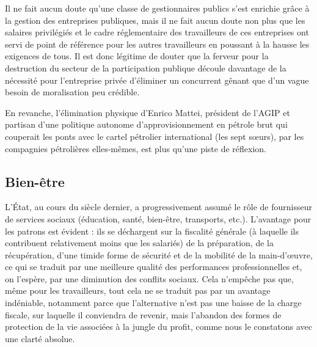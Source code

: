 Il ne fait aucun doute qu'une classe de gestionnaires publics s'est enrichie grâce à la gestion des entreprises publiques, mais il ne fait aucun doute non plus que les salaires privilégiés et le cadre réglementaire des travailleurs de ces entreprises ont servi de point de référence pour les autres travailleurs en poussant à la hausse les exigences de tous. Il est donc légitime de douter que la ferveur pour la destruction du secteur de la participation publique découle davantage de la nécessité pour l'entreprise privée d'éliminer un concurrent gênant que d'un vague besoin de moralisation peu crédible.

En revanche, l'élimination physique d'Enrico Mattei, président de l'AGIP et partisan d'une politique autonome d'approvisionnement en pétrole brut qui couperait les ponts avec le cartel pétrolier international (les sept sœurs), par les compagnies pétrolières elles-mêmes, est plus qu'une piste de réflexion.

\subsection{Bien-être}

L'État, au cours du siècle dernier, a progressivement assumé le rôle de fournisseur de services sociaux (éducation, santé, bien-être, transports, etc.). L'avantage pour les patrons est évident : ils se déchargent sur la fiscalité générale (à laquelle ils contribuent relativement moins que les salariés) de la préparation, de la récupération, d'une timide forme de sécurité et de la mobilité de la main-d'œuvre, ce qui se traduit par une meilleure qualité des performances professionnelles et, on l'espère, par une diminution des conflits sociaux. Cela n'empêche pas que, même pour les travailleurs, tout cela ne se traduit pas par un avantage indéniable, notamment parce que l'alternative n'est pas une baisse de la charge fiscale, sur laquelle il conviendra de revenir, mais l'abandon des formes de protection de la vie associées à la jungle du profit, comme nous le constatons avec une clarté absolue.

